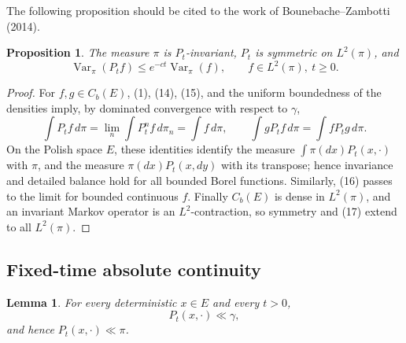 \documentclass[12pt]{article}
\newtheorem{lemma}{Lemma}
\newtheorem{proposition}{Proposition}
\newcommand{\1}{\mathbf 1}
\newcommand{\Var}{\operatorname{Var}}
\newcommand{\review}[1]{\begin{reviewbox}#1\end{reviewbox}}
\begin{document}
\review{The following proposition should be cited to the work of Bounebache--Zambotti (2014).}
\begin{proposition}\label{prop:gap}
The measure \(\pi\) is \(P_t\)-invariant, \(P_t\) is symmetric on
\(L^2(\pi)\), and
\[
       \Var_\pi(P_t f)\le e^{-ct}\Var_\pi(f),
       \qquad f\in L^2(\pi),\ t\ge0 .                       \tag{17}
\]
\end{proposition}

\begin{proof}
For \(f,g\in C_b(E)\), (1), (14), (15), and the uniform boundedness of the
densities imply, by dominated convergence with respect to \(\gamma\),
\[
 \int P_tf\,d\pi=\lim_n\int P_t^nf\,d\pi_n=\int f\,d\pi,\qquad
 \int gP_tf\,d\pi=\int fP_tg\,d\pi .
\]
On the Polish space \(E\), these identities identify the measure
\(\int\pi(dx)P_t(x,\cdot)\) with \(\pi\), and the measure
\(\pi(dx)P_t(x,dy)\) with its transpose; hence invariance and detailed balance
hold for all bounded Borel functions.  Similarly, (16) passes to the limit for
bounded continuous \(f\).  Finally \(C_b(E)\) is dense in \(L^2(\pi)\), and an
invariant Markov operator is an \(L^2\)-contraction, so symmetry and (17)
extend to all \(L^2(\pi)\).
\end{proof}

\subsection*{Fixed-time absolute continuity}

\begin{lemma}\label{lem:control}
For every deterministic \(x\in E\) and every \(t>0\),
\[
        P_t(x,\cdot)\ll \gamma ,
\]
and hence \(P_t(x,\cdot)\ll\pi\).
\end{lemma}
\end{document}
